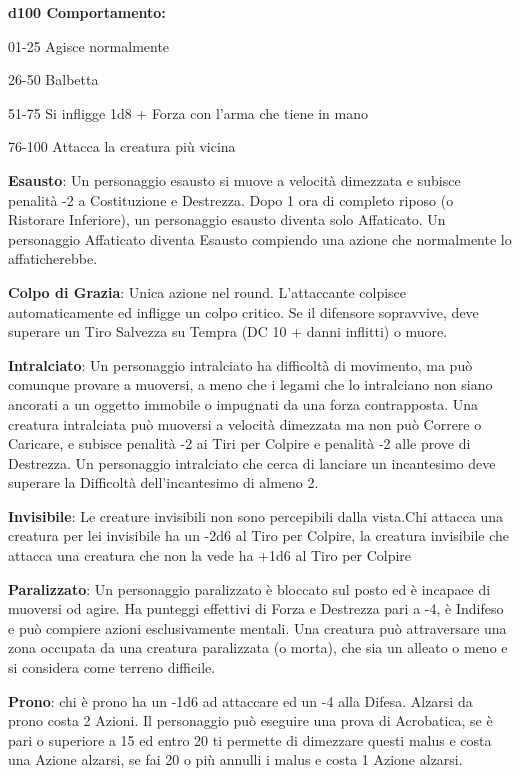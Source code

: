 \documentclass[a4paper,12 pt,openany]{book}
\begin{document}
\begin{textblock*}{19 cm}
\begin{multicols}{2}
\textbf{d100 Comportamento:}
			
01-25 Agisce normalmente
			
26-50 Balbetta
			
51-75 Si infligge 1d8 + Forza con l'arma che tiene in mano
		
76-100 Attacca la creatura più vicina 
			
\textbf{Esausto}: Un personaggio esausto si muove a velocità dimezzata e subisce penalità -2 a Costituzione e Destrezza. Dopo 1 ora di completo riposo (o Ristorare Inferiore), un personaggio esausto diventa solo Affaticato. Un personaggio Affaticato diventa Esausto compiendo una azione che normalmente lo affaticherebbe.
			
\textbf{Colpo di Grazia}: Unica azione nel round. L'attaccante colpisce automaticamente ed infligge un colpo critico. Se il difensore sopravvive, deve superare un Tiro Salvezza su Tempra (DC 10 + danni inflitti) o muore.
			
\textbf{Intralciato}: Un personaggio intralciato ha difficoltà di movimento, ma può comunque provare a muoversi, a meno che i legami che lo intralciano non siano ancorati a un oggetto immobile o impugnati da una forza contrapposta.
Una creatura intralciata può muoversi a velocità dimezzata ma non può Correre o Caricare, e subisce penalità -2 ai Tiri per Colpire e penalità -2 alle prove di Destrezza.
Un personaggio intralciato che cerca di lanciare un incantesimo deve superare la Difficoltà dell'incantesimo di almeno 2.
			
\textbf{Invisibile}: Le creature invisibili non sono percepibili dalla vista.Chi attacca una creatura per lei invisibile ha un -2d6 al Tiro per Colpire, la creatura invisibile che attacca una creatura che non la vede ha +1d6 al Tiro per Colpire
			
\textbf{Paralizzato}: Un personaggio paralizzato è bloccato sul posto ed è incapace di muoversi od agire. Ha punteggi effettivi di Forza e Destrezza pari a -4, è Indifeso e può compiere azioni esclusivamente mentali.
Una creatura può attraversare una zona occupata da una creatura paralizzata (o morta), che sia un alleato o meno e si considera come terreno difficile.
			
\textbf{Prono}: chi è prono ha un -1d6 ad attaccare ed un -4 alla Difesa. Alzarsi da prono costa 2 Azioni.
Il personaggio può eseguire una prova di Acrobatica, se è pari o superiore a 15 ed entro 20 ti permette di dimezzare questi malus e costa una Azione alzarsi, se fai 20 o più annulli i malus e costa 1 Azione alzarsi.
			

\end{multicols}
\end{textblock*}
\end{document}
